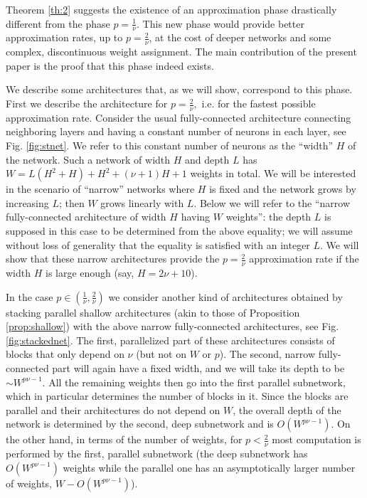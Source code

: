 \documentclass[final, 12pt]{colt2018}
\begin{document}
Theorem \ref{th:2} suggests the existence of an approximation phase drastically different from the phase $p=\frac{1}{\nu}$. This new phase would provide better approximation rates, up to $p=\frac{2}{\nu}$, at the cost of deeper networks and some complex, discontinuous weight assignment. The main contribution of the present paper is the proof that this phase indeed exists. 

We describe some architectures that, as we will show, correspond to this phase. First we describe the architecture for $p=\frac{2}{\nu},$ i.e. for the fastest possible approximation rate. Consider the usual fully-connected architecture connecting neighboring layers and having a constant number of neurons in each layer, see Fig. \ref{fig:stnet}. We refer to this constant number of neurons as the  ``width'' $H$ of the network. Such a network of width $H$ and depth $L$ has $W=L(H^2+H)+H^2+(\nu+1)H+1$ weights in total. We will be interested in the scenario of ``narrow'' networks where $H$ is fixed and the network grows by increasing $L$; then $W$ grows linearly with $L$. Below we will refer to the ``narrow fully-connected architecture of width $H$ having $W$ weights'': the depth $L$ is supposed in this case to be determined from the above equality; we will assume without loss of generality that  the equality is satisfied with an integer $L$. We will show that these narrow architectures provide the $p=\frac{2}{\nu}$ approximation rate if the width $H$ is large enough (say, $H=2\nu+10$).   

In the case $p\in (\frac{1}{\nu},\frac{2}{\nu})$ we consider another kind of architectures obtained by stacking parallel shallow architectures (akin to those of Proposition \ref{prop:shallow}) with the above narrow fully-connected architectures, see Fig. \ref{fig:stackednet}. The first, parallelized part of these architectures consists of blocks that only depend on $\nu$ (but not on $W$ or $p$). The second, narrow fully-connected part will again have a fixed width,  and we will take its depth to be $\sim W^{p\nu-1}$. All the remaining weights then go into the first parallel subnetwork, which in particular determines the number of blocks in it. Since the blocks are parallel and their architectures do not depend on $W$, the overall depth of the network is determined by the second, deep subnetwork and is $O(W^{p\nu-1})$. On the other hand, in terms of the number of weights, for $p<\frac{2}{\nu}$ most computation is performed by the first, parallel subnetwork (the deep subnetwork has $O(W^{p\nu-1})$ weights while the parallel one has an asymptotically larger number of weights, $W-O(W^{p\nu-1})$). 
\end{document}
